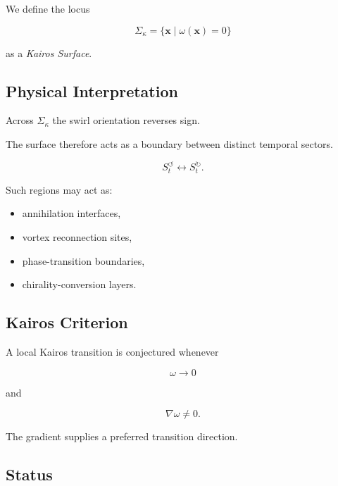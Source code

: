         We define the locus
        
        \[
            \Sigma_\kappa
            =
            \{
            \mathbf{x}
            \;|\;
            \omega(\mathbf{x})=0
            \}
        \]
        
        as a \emph{Kairos Surface}.
    
    \subsection{Physical Interpretation}
        
        Across $\Sigma_\kappa$ the swirl orientation reverses sign.
        
        The surface therefore acts as a boundary between distinct temporal sectors.
        
        \[
            S_t^{\circlearrowleft}
            \longleftrightarrow
            S_t^{\circlearrowright}.
        \]
        
        Such regions may act as:
        
        \begin{itemize}
            \item annihilation interfaces,
            \item vortex reconnection sites,
            \item phase-transition boundaries,
            \item chirality-conversion layers.
        \end{itemize}
    
    \subsection{Kairos Criterion}
        
        A local Kairos transition is conjectured whenever
        
        \[
            \omega
            \rightarrow
            0
        \]
        
        and
        
        \[
            \nabla\omega
            \neq
            0.
        \]
        
        The gradient supplies a preferred transition direction.
    
    \subsection{Status}
        
